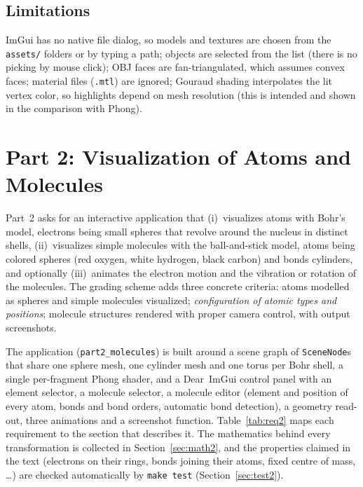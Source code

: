 \documentclass[a4paper, 11pt]{article}
\newcommand{\code}[1]{\texttt{#1}}
\begin{document}
\subsection{Limitations}

ImGui has no native file dialog, so models and textures are chosen from the \code{assets/} folders or by typing a path; objects are selected from the list
(there is no picking by mouse click); OBJ faces are fan-triangulated, which assumes convex faces; material files (\code{.mtl}) are ignored; Gouraud shading interpolates the lit vertex
color, so highlights depend on mesh resolution (this is intended and shown in the comparison with Phong).

\section{Part 2: Visualization of Atoms and Molecules}\label{sec:part2}

Part~2 asks for an interactive application that (i)~visualizes atoms with Bohr's model, electrons being small spheres that revolve
around the nucleus in distinct shells, (ii)~visualizes simple molecules with the ball-and-stick model, atoms being colored spheres
(red oxygen, white hydrogen, black carbon) and bonds cylinders, and optionally (iii)~animates the electron motion and the vibration or
rotation of the molecules. The grading scheme adds three concrete criteria: atoms modelled as spheres and simple molecules visualized;
\emph{configuration of atomic types and positions}; molecule structures rendered with proper camera control, with output screenshots.

The application (\code{part2\_molecules}) is built around a scene graph of \code{SceneNode}s that share one sphere mesh, one cylinder mesh
and one torus per Bohr shell, a single per-fragment Phong shader, and a Dear~ImGui control panel with an element selector, a molecule
selector, a molecule editor (element and position of every atom, bonds and bond orders, automatic bond detection), a geometry read-out,
three animations and a screenshot function. Table~\ref{tab:req2} maps each requirement to the section that describes it.
The mathematics behind every transformation is collected in Section~\ref{sec:math2}, and the properties claimed in the text
(electrons on their rings, bonds joining their atoms, fixed centre of mass, \ldots) are checked automatically by \code{make test}
(Section~\ref{sec:test2}).
\end{document}
